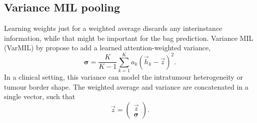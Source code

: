 \subsection{Variance MIL pooling}
Learning weights just for a weighted average discards any interinstance information, while that might be important for the bag prediction.
Variance MIL (VarMIL) by \textcite{Schirris2022} propose to add a learned attention-weighted variance,
\begin{equation}
    \boldsymbol{\sigma} = \frac{K}{K - 1} \sum_{k=1}^{K}a_k\left(\vec{h}_k-\vec{z}\right)^2.
\end{equation}
In a clinical setting, this variance can model \eg the intratumour heterogeneity or tumour border shape.
The weighted average and variance are concatenated in a single vector, such that
\begin{equation}
    \hat{\vec{z}} =
    \begin{pmatrix}
        \vec{z} \\
        \boldsymbol{\sigma}    
    \end{pmatrix}.
\end{equation}
